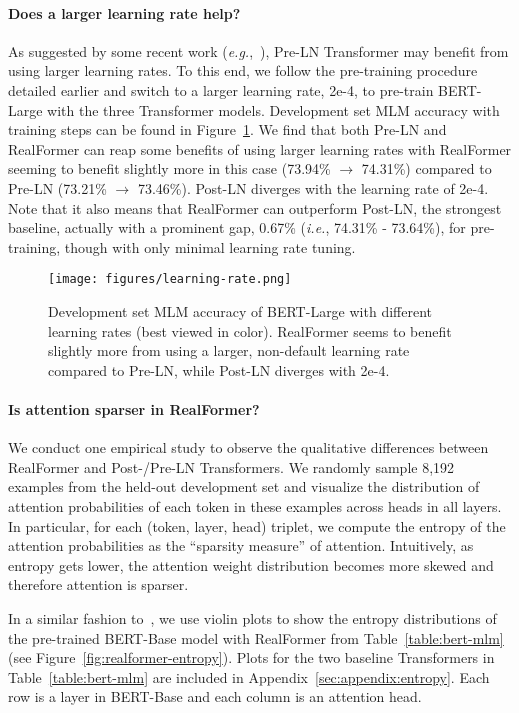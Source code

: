 \documentclass[11pt,a4paper]{article}
\begin{document}
\paragraph{Does a larger learning rate help?}
As suggested by some recent work (\emph{e.g.},~\citet{Xiong-2020-preln}), Pre-LN Transformer may benefit from using larger learning rates. To this end, we follow the pre-training procedure detailed earlier and switch to a larger learning rate, 2e-4, to pre-train BERT-Large with the three Transformer models. Development set MLM accuracy with training steps can be found in Figure~\ref{fig:lr}. We find that both Pre-LN and RealFormer can reap some benefits of using larger learning rates with RealFormer seeming to benefit slightly more in this case (73.94\% $\rightarrow$ 74.31\%) compared to Pre-LN (73.21\% $\rightarrow$ 73.46\%). Post-LN diverges with the learning rate of 2e-4.
Note that it also means that RealFormer can outperform Post-LN, the strongest baseline, actually with a prominent gap, 0.67\% (\emph{i.e.}, 74.31\% - 73.64\%), for pre-training, though with only minimal learning rate tuning.

\begin{figure}
\centering
\texttt{[image: figures/learning-rate.png]}
\caption{Development set MLM accuracy of BERT-Large with different learning rates (best viewed in color). RealFormer seems to benefit slightly more from using a larger, non-default learning rate compared to Pre-LN, while Post-LN diverges with 2e-4.}
\label{fig:lr}
\end{figure}



\paragraph{Is attention sparser in RealFormer?}
We conduct one empirical study to observe the qualitative differences between RealFormer and Post-/Pre-LN Transformers. 
We randomly sample 8,192 examples from the held-out development set and visualize the distribution of attention probabilities of each token in these examples across heads in all layers.
In particular, for each (token, layer, head) triplet, we compute the entropy of the attention probabilities as the ``sparsity measure'' of attention. Intuitively, as entropy gets lower, the attention weight distribution becomes more skewed and therefore attention is sparser.

In a similar fashion to~\citet{Ramsauer-2020-hopfield}, we use violin plots to show the entropy distributions of the pre-trained BERT-Base model with RealFormer from Table~\ref{table:bert-mlm} (see Figure~\ref{fig:realformer-entropy}).
Plots for the two baseline Transformers in Table~\ref{table:bert-mlm} are included in Appendix~\ref{sec:appendix:entropy}.
Each row is a layer in BERT-Base and each column is an attention head.
\end{document}
